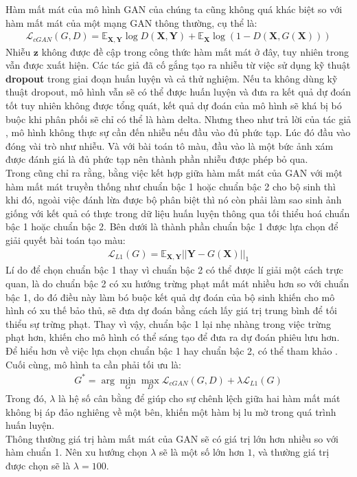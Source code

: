 \documentclass[a4paper, 12pt]{article}
\begin{document}
Hàm mất mát của mô hình GAN của chúng ta cũng không quá khác biệt so với hàm mất mát của một mạng GAN thông thường, cụ thể là:
\begin{align*}
    \mathcal{L}_{cGAN}(G, D) = \mathbb{E}_{\mathbf{X}, \mathbf{Y}}\log D\left(\mathbf{X}, \mathbf{Y}\right) + \mathbb{E}_{\mathbf{X}}\log \left(1 - D\left(\mathbf{X}, G\left(\mathbf{X}\right)\right)\right)
\end{align*}
\noindent
Nhiễu $\mathbf{z}$ không được đề cập trong công thức hàm mất mát ở đây, tuy nhiên trong \cite{isola2018imagetoimage} vẫn được xuất hiện. Các tác giả đã cố gắng tạo ra nhiễu từ việc sử dụng kỹ thuật \textbf{dropout} trong giai đoạn huấn luyện và cả thử nghiệm. Nếu ta không dùng kỹ thuật dropout, mô hình vẫn sẽ có thể được huấn luyện và đưa ra kết quả dự đoán tốt tuy nhiên không được tổng quát, kết quả dự đoán của mô hình sẽ khá bị bó buộc khi phân phối sẽ chỉ có thể là hàm delta. Nhưng theo như trả lời của tác giả \cite{replyrandomnoisez}, mô hình không thực sự cần đến nhiễu nếu đầu vào đủ phức tạp. Lúc đó đầu vào đóng vài trò như nhiễu. Và với bài toán tô màu, đầu vào là một bức ảnh xám được đánh giá là đủ phức tạp nên thành phần nhiễu được phép bỏ qua.\vspace{5pt}\\
Trong \cite{isola2018imagetoimage} cũng chỉ ra rằng, bằng việc kết hợp giữa hàm mất mát của GAN với một hàm mất mát truyền thống như chuẩn bậc 1 hoặc chuẩn bậc 2 cho bộ sinh thì khi đó, ngoài việc đánh lừa được bộ phân biệt thì nó còn phải làm sao sinh ảnh giống với kết quả có thực trong dữ liệu huấn luyện thông qua tối thiểu hoá chuẩn bậc 1 hoặc chuẩn bậc 2. Bên dưới là thành phần chuẩn bậc 1 được lựa chọn để giải quyết bài toán tạo màu:
\begin{align*}
    \mathcal{L}_{L1}(G) = \mathbb{E}_{\mathbf{X}, \mathbf{Y}}\left|\left|\mathbf{Y} - G(\mathbf{X})\right|\right|_1
\end{align*}
Lí do để chọn chuẩn bậc 1 thay vì chuẩn bậc 2 có thể được lí giải một cách trực quan, là do chuẩn bậc 2 có xu hướng trừng phạt mất mát nhiều hơn so với chuẩn bậc 1, do đó điều này làm bó buộc kết quả dự đoán của bộ sinh khiến cho mô hình có xu thế bảo thủ, sẽ đưa dự đoán bằng cách lấy giá trị trung bình để tối thiểu sự trừng phạt. Thay vì vậy, chuẩn bậc 1 lại nhẹ nhàng trong việc trừng phạt hơn, khiến cho mô hình có thể sáng tạo để đưa ra dự đoán phiêu lưu hơn. Để hiểu hơn về việc lựa chọn chuẩn bậc 1 hay chuẩn bậc 2, có thể tham khảo \cite{replynorm1ornorm2}.\vspace{5pt}\\
Cuối cùng, mô hình ta cần phải tối ưu là:
\begin{align*}
    G^* = \arg\underset{G}{\min}\underset{D}{\max}\mathcal{L}_{cGAN}(G, D) + \lambda \mathcal{L}_{L1}(G)
\end{align*}
Trong đó, $\lambda$ là hệ số cân bằng để giúp cho sự chênh lệch giữa hai hàm mất mát không bị áp đảo nghiêng về một bên, khiến một hàm bị lu mờ trong quá trình huấn luyện.\\
Thông thường giá trị hàm mất mát của GAN sẽ có giá trị lớn hơn nhiều so với hàm chuẩn 1. Nên xu hướng chọn $\lambda$ sẽ là một số lớn hơn $1$, và thường giá trị được chọn sẽ là $\lambda = 100$.
\end{document}
